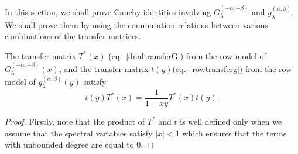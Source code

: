 \documentclass[ALCO, Unicode]{cedram}
\newcommand\g{{g^{(\alpha,\beta)}_{\lambda}}}
\begin{document}
In this section, we shall prove Cauchy identities involving $G^{(-\alpha,-\beta)}_{\lambda}$ and $\g$. We shall prove them by using the commutation relations between various combinations of the transfer matrices.
\begin{prop}\label{prop:commcauchy}
The transfer matrix $T^*(x)$ \textup{(}eq.~\eqref{dualtransferG}\textup{)} from the row model of 
$G^{(-\alpha,-\beta)}_{\lambda}(x)$,
and the transfer matrix $t(y)$\textup{(}eq.~\eqref{rowtransferg}\textup{)} from the row model of $\g(y)$ satisfy
\begin{equation}
\label{cauchytransferrel}
{t}(y) {T^{*}}(x)= \frac{1}{1-xy} {T^{*}}(x) {t}(y).
\end{equation}
\end{prop}
\begin{proof}
Firstly, note that the product of $T^{*}$ and $t$ is well defined only when we assume that the spectral variables  satisfy $|x|< 1$ which ensures that the terms with unbounded degree are equal to $0$.


\end{proof}
\end{document}
